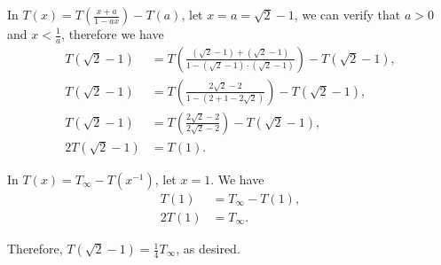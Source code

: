 \begin{enumerate}
          In \(T(x) = T\left(\frac{x + a}{1 - ax}\right) - T(a)\), let \(x = a = \sqrt{2} - 1\), we can verify that \(a > 0\) and \(x < \frac{1}{a}\), therefore we have
          \begin{align*}
              T(\sqrt{2} - 1)  & = T\left(\frac{(\sqrt{2} - 1) + (\sqrt{2} - 1)}{1 - (\sqrt{2} - 1) \cdot (\sqrt{2} - 1)}\right) - T(\sqrt{2} - 1), \\
              T(\sqrt{2} - 1)  & = T\left(\frac{2\sqrt{2} - 2}{1 - \left(2 + 1 - 2\sqrt{2}\right)}\right) - T(\sqrt{2} - 1),                        \\
              T(\sqrt{2} - 1)  & = T\left(\frac{2\sqrt{2} - 2}{2\sqrt{2} - 2}\right) - T(\sqrt{2} - 1),                                             \\
              2T(\sqrt{2} - 1) & = T(1).
          \end{align*}

          In \(T(x) = T_{\infty} - T(x^{-1})\), let \(x = 1\). We have
          \begin{align*}
              T(1)  & = T_{\infty} - T(1), \\
              2T(1) & = T_{\infty}.
          \end{align*}

          Therefore, \(T(\sqrt{2} - 1) = \frac{1}{4} T_{\infty}\), as desired.
\end{enumerate}